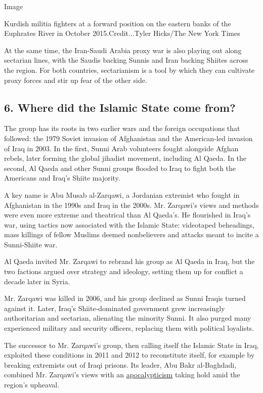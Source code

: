 Image

Kurdish militia fighters at a forward position on the eastern banks of
the Euphrates River in October 2015.Credit...Tyler Hicks/The New York
Times

At the same time, the Iran-Saudi Arabia proxy war is also playing out
along sectarian lines, with the Saudis backing Sunnis and Iran backing
Shiites across the region. For both countries, sectarianism is a tool by
which they can cultivate proxy forces and stir up fear of the other
side.

\hypertarget{6-where-did-the-islamic-state-come-from}{%
\subsection{\texorpdfstring{\textbf{6. Where did the Islamic State come
from?}}{6. Where did the Islamic State come from?}}\label{6-where-did-the-islamic-state-come-from}}

The group has its roots in two earlier wars and the foreign occupations
that followed: the 1979 Soviet invasion of Afghanistan and the
American-led invasion of Iraq in 2003. In the first, Sunni Arab
volunteers fought alongside Afghan rebels, later forming the global
jihadist movement, including Al Qaeda. In the second, Al Qaeda and other
Sunni groups flooded to Iraq to fight both the Americans and Iraq's
Shiite majority.

A key name is Abu Musab al-Zarqawi, a Jordanian extremist who fought in
Afghanistan in the 1990s and Iraq in the 2000s. Mr. Zarqawi's views and
methods were even more extreme and theatrical than Al Qaeda's. He
flourished in Iraq's war, using tactics now associated with the Islamic
State: videotaped beheadings, mass killings of fellow Muslims deemed
nonbelievers and attacks meant to incite a Sunni-Shiite war.

Al Qaeda invited Mr. Zarqawi to rebrand his group as Al Qaeda in Iraq,
but the two factions argued over strategy and ideology, setting them up
for conflict a decade later in Syria.

Mr. Zarqawi was killed in 2006, and his group declined as Sunni Iraqis
turned against it. Later, Iraq's Shiite-dominated government grew
increasingly authoritarian and sectarian, alienating the minority Sunni.
It also purged many experienced military and security officers,
replacing them with political loyalists.

The successor to Mr. Zarqawi's group, then calling itself the Islamic
State in Iraq, exploited these conditions in 2011 and 2012 to
reconstitute itself, for example by breaking extremists out of Iraqi
prisons. Its leader, Abu Bakr al-Baghdadi, combined Mr. Zarqawi's views
with an
\href{http://www.politico.com/magazine/story/2015/08/isis-jihad-121525}{apocalypticism}
taking hold amid the region's upheaval.

